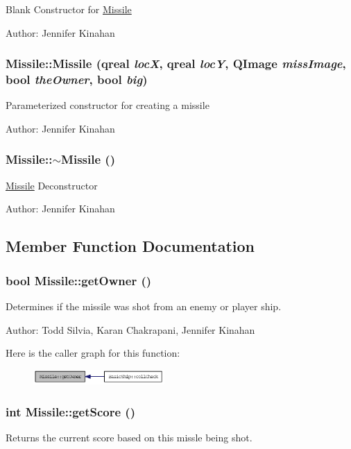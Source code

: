 Blank Constructor for \hyperlink{class_missile}{Missile}

Author: Jennifer Kinahan \hypertarget{class_missile_a4698129ffe314da23ae2fdc074c1aaa4}{
\subsubsection[{Missile}]{\setlength{\rightskip}{0pt plus 5cm}Missile::Missile (qreal {\em locX}, \/  qreal {\em locY}, \/  QImage {\em missImage}, \/  bool {\em theOwner}, \/  bool {\em big})}}
\label{class_missile_a4698129ffe314da23ae2fdc074c1aaa4}
Parameterized constructor for creating a missile

Author: Jennifer Kinahan \hypertarget{class_missile_ad42379e48a46ec3556056f98ce8bd912}{
\subsubsection[{$\sim$Missile}]{\setlength{\rightskip}{0pt plus 5cm}Missile::$\sim$Missile ()}}
\label{class_missile_ad42379e48a46ec3556056f98ce8bd912}
\hyperlink{class_missile}{Missile} Deconstructor

Author: Jennifer Kinahan 

\subsection{Member Function Documentation}
\hypertarget{class_missile_ae5d94b0814411d51750eb919f919a440}{
\subsubsection[{getOwner}]{\setlength{\rightskip}{0pt plus 5cm}bool Missile::getOwner ()}}
\label{class_missile_ae5d94b0814411d51750eb919f919a440}
Determines if the missile was shot from an enemy or player ship.

Author: Todd Silvia, Karan Chakrapani, Jennifer Kinahan 

Here is the caller graph for this function:\nopagebreak
\begin{figure}[H]
\begin{center}
\leavevmode
\includegraphics[width=142pt]{class_missile_ae5d94b0814411d51750eb919f919a440_icgraph}
\end{center}
\end{figure}
\hypertarget{class_missile_a1287c194f7a2b619fc5ebc126707d29b}{
\subsubsection[{getScore}]{\setlength{\rightskip}{0pt plus 5cm}int Missile::getScore ()}}
\label{class_missile_a1287c194f7a2b619fc5ebc126707d29b}
Returns the current score based on this missle being shot.

